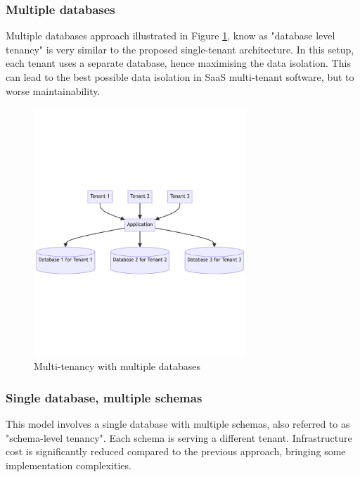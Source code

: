 \subsubsection{Multiple databases}
Multiple databases approach illustrated in Figure \ref{img04:multitenancy-multiple-databases}, know as "database level tenancy" is very similar to the proposed single-tenant architecture.
In this setup, each tenant uses a separate database, hence maximising the data isolation. 
This can lead to the best possible data isolation in \ac{SaaS} multi-tenant software, but to worse maintainability. 

\begin{figure}[p]\centering
\includegraphics[width=80mm]{img/chap04/fig_multitenancy_multiple_databases.png}
\caption{Multi-tenancy with multiple databases}
\label{img04:multitenancy-multiple-databases}
\end{figure}

\subsubsection{Single database, multiple schemas}

This model involves a single database with multiple schemas, also referred to as "schema-level tenancy".
Each schema is serving a different tenant.
Infrastructure cost is significantly reduced compared to the previous approach, bringing some implementation complexities.


